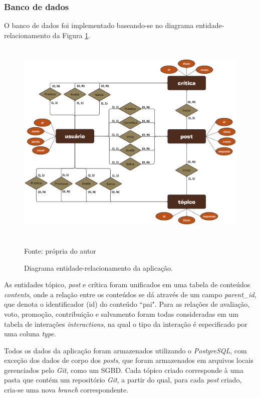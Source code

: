 \subsubsection{Banco de dados}
O banco de dados foi implementado baseando-se no  diagrama entidade-relacionamento da Figura \ref{fig:er}.

\begin{figure}[hbt!]
\centering
\includegraphics[height=10cm]{imagens/er_diagram.png}
\caption{Diagrama entidade-relacionamento da aplicação.}
Fonte: própria do autor
\label{fig:er}
\end{figure}

As entidades tópico, \textit{post} e crítica foram unificados em uma tabela de conteúdos \textit{contents}, onde a relação entre os conteúdos se dá através de um campo \textit{parent\_id}, que denota o identificador (id) do conteúdo “pai". Para as relações de avaliação, voto, promoção, contribuição e salvamento foram todas consideradas em um tabela de interações \textit{interactions}, na qual o tipo da interação é especificado por uma coluna \textit{type}.

Todos os dados da aplicação foram armazenados utilizando o \textit{PostgreSQL}, com exceção dos dados de corpo dos \textit{posts}, que foram armazenados em arquivos locais gerenciados pelo \textit{Git}, como um SGBD. Cada tópico criado corresponde à uma pasta que contém um repositório \textit{Git}, a partir do qual, para cada \textit{post} criado, cria-se uma nova \textit{branch} correspondente.




